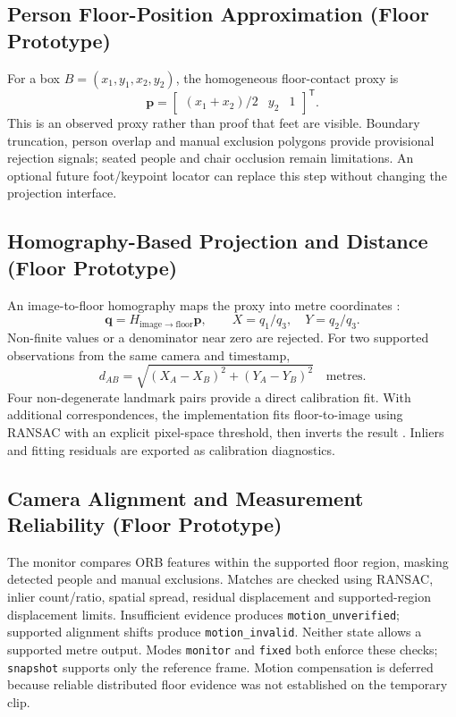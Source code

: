 \subsection{Person Floor-Position Approximation (Floor Prototype)}
For a box $B=(x_1,y_1,x_2,y_2)$, the homogeneous floor-contact proxy is
\begin{equation}
\mathbf{p}=\begin{bmatrix}(x_1+x_2)/2 & y_2 & 1\end{bmatrix}^{\mathsf T}.
\label{eq:floor-foot}
\end{equation}
This is an observed proxy rather than proof that feet are visible. Boundary truncation, person overlap and manual exclusion polygons provide provisional rejection signals; seated people and chair occlusion remain limitations. An optional future foot/keypoint locator can replace this step without changing the projection interface.

\subsection{Homography-Based Projection and Distance (Floor Prototype)}
An image-to-floor homography maps the proxy into metre coordinates \cite{hartley2004multiple,opencvHomography}:
\begin{equation}
\mathbf{q}=H_{\mathrm{image}\rightarrow\mathrm{floor}}\mathbf{p},\qquad
X=q_1/q_3,\quad Y=q_2/q_3.
\label{eq:floor-project}
\end{equation}
Non-finite values or a denominator near zero are rejected. For two supported observations from the same camera and timestamp,
\begin{equation}
d_{AB}=\sqrt{(X_A-X_B)^2+(Y_A-Y_B)^2}\quad\text{metres}.
\label{eq:floor-distance}
\end{equation}
Four non-degenerate landmark pairs provide a direct calibration fit. With additional correspondences, the implementation fits floor-to-image using RANSAC with an explicit pixel-space threshold, then inverts the result \cite{fischler1981ransac}. Inliers and fitting residuals are exported as calibration diagnostics.

\subsection{Camera Alignment and Measurement Reliability (Floor Prototype)}
The monitor compares ORB features \cite{rublee2011orb} within the supported floor region, masking detected people and manual exclusions. Matches are checked using RANSAC, inlier count/ratio, spatial spread, residual displacement and supported-region displacement limits. Insufficient evidence produces \texttt{motion\_unverified}; supported alignment shifts produce \texttt{motion\_invalid}. Neither state allows a supported metre output. Modes \texttt{monitor} and \texttt{fixed} both enforce these checks; \texttt{snapshot} supports only the reference frame. Motion compensation is deferred because reliable distributed floor evidence was not established on the temporary clip.

